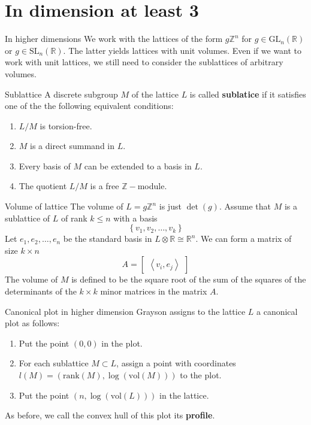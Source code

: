 \documentclass[pdf]{beamer}
\begin{document}
\section{In dimension at least 3}
\begin{frame}{In higher dimensions}
    We work with the lattices of the form $g\mathbb{Z}^n$ for $g \in \text{GL}_n(\mathbb{R})$ or
    $g \in \text{SL}_n(\mathbb{R})$. The latter yields lattices with unit volumes. Even if we want to work with unit lattices,
    we still need to consider the sublattices of arbitrary volumes.
    \pause
    \begin{block}{Sublattice}
        A discrete subgroup $M$ of the lattice $L$ is called \textbf{sublatice} if it satisfies one of the
        the following equivalent conditions:
        \begin{enumerate}
            \item $L/M$ is torsion-free.
            \item $M$ is a direct summand in $L$.
            \item Every basis of $M$ can be extended to a basis in $L$.
            \item The quotient $L/M$ is a free $\mathbb{Z}-$module.
        \end{enumerate}
    \end{block}
\end{frame}
\begin{frame}{Volume of lattice}
    The volume of $L = g\mathbb{Z}^n$ is just $\det(g)$. Assume that $M$ is a sublattice of $L$ of rank $k \le n$
    with a basis
    \[\left\lbrace v_1, v_2,\ldots, v_k\right\rbrace\] \pause
    Let $e_1,e_2,\ldots,e_n$ be the standard basis in $L \otimes \mathbb{R} \cong \mathbb{R}^n$. We can form a matrix of size $k \times n$
    \[A = \begin{bmatrix}
            \left\langle v_i ,e_j\right\rangle
        \end{bmatrix}\]
    The volume of $M$ is defined to be the square root of the  sum of the squares of the determinants of the $k \times k$ minor matrices in the matrix $A$.
\end{frame}
\begin{frame}{Canonical plot in higher dimension}
    Grayson assigns to the lattice $L$ a canonical plot as follows:
    \begin{enumerate}
        \item Put the point $(0,0)$ in the plot.
        \item For each sublattice $M \subset L$, assign a point with coordinates ${l}(M) = (\text{rank}(M), \log(\text{vol}(M)))$ to the plot.
        \item Put the point $(n, \log(\text{vol}(L)))$ in the lattice.
    \end{enumerate} \pause

    As before, we call the convex hull of this plot its \textbf{profile}.
\end{frame}
\end{document}
